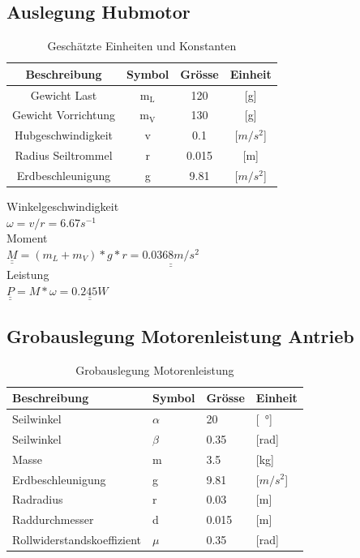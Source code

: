 \documentclass[a4paper]{report}
\begin{document}
\subsection{Auslegung Hubmotor}
\begin{table}[h!]
	\centering
	\begin{tabular}{|c|c|c|c|}
		\hline
		\textbf{Beschreibung}& \textbf{Symbol} & \textbf{Grösse} & \textbf{Einheit} \\
		\hline
		Gewicht Last& m$_{\text{L}}$ & 120 & [g] \\
		\hline
		Gewicht Vorrichtung& m$_{\text{V}}$ & 130 & [g] \\
		\hline
		Hubgeschwindigkeit& v & 0.1 & [$m/s^2$] \\
		\hline
		Radius Seiltrommel & r & 0.015 & [m]\\
		\hline
		Erdbeschleunigung & g & 9.81 & [$m/s^2$]\\
		\hline
	\end{tabular}
	\caption{Geschätzte Einheiten und Konstanten}
\end{table}
\noindent
Winkelgeschwindigkeit\\
$\omega=v/r=6.67s^{-1}$	\\
Moment\\
$\underline{\underline{M}}=(m_L+m_V)*g*r=\underline{\underline{0.0368m/s^2}}$\\
Leistung	\\
$\underline{\underline{P}}=M*\omega=\underline{\underline{0.245W}}$

\subsection{Grobauslegung Motorenleistung Antrieb}
\label{ssec:GrobMotor}
\begin{table}[h!]
	\begin{tabular}{|p{}|p{}|p{}|p{}|}
		\hline
		\textbf{Beschreibung} & \textbf{Symbol} & \textbf{Grösse}& \textbf{Einheit}  \\
		\hline
		Seilwinkel & $\alpha$ & 20 & [\SI{}{\degree}] \\
		\hline
		Seilwinkel & $\beta$ & 0.35 & [rad] \\
		\hline
		Masse & m & 3.5 & [kg] \\
		\hline
		Erdbeschleunigung & g & 9.81 & [$m/s^2$] \\
		\hline
		Radradius & r & 0.03 & [m] \\
		\hline
		Raddurchmesser & d & 0.015 & [m] \\
		\hline
		Rollwiderstandskoeffizient & $\mu$ & 0.35 & [rad] \\
		\hline
	\end{tabular}
	\caption{Grobauslegung Motorenleistung}
\label{tbl:Motorenleistung}
\end{table}
\end{document}
